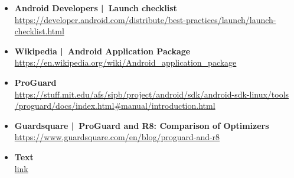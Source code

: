 \documentclass[a4paper]{article}
\begin{document}
\begin{itemize}
		\item \textbf{Android Developers | Launch checklist}\\
		\href{https://developer.android.com/distribute/best-practices/launch/launch-checklist.html}
		{https://developer.android.com/distribute/best-practices/launch/launch-checklist.html}
		
		\item \textbf{Wikipedia | Android Application Package}\\
		\href{https://en.wikipedia.org/wiki/Android_application_package}
		{https://en.wikipedia.org/wiki/Android\_application\_package}
		
		\item \textbf{ProGuard}\\
		\href{https://stuff.mit.edu/afs/sipb/project/android/sdk/android-sdk-linux/tools/proguard/docs/index.html#manual/introduction.html}
		{https://stuff.mit.edu/afs/sipb/project/android/sdk/android-sdk-linux/tools\\ \quad /proguard/docs/index.html\#manual/introduction.html}
		
		\item \textbf{Guardsquare | ProGuard and R8: Comparison of Optimizers}\\
		\href{https://www.guardsquare.com/en/blog/proguard-and-r8}
		{https://www.guardsquare.com/en/blog/proguard-and-r8}
		
		\item \textbf{Text}\\
		\href{link}
		{link}
		
	\end{itemize}
\end{document}
